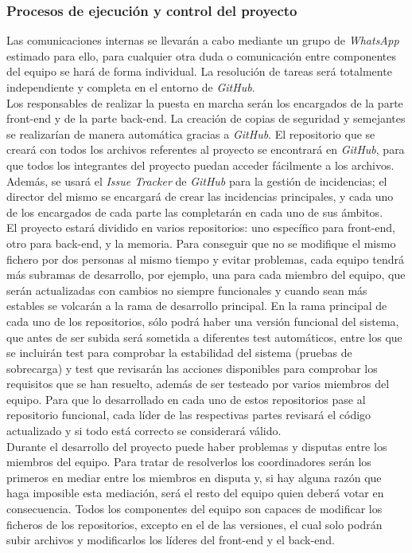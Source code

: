 \documentclass{article}
\begin{document}
\subsubsection{Procesos de ejecución y control del proyecto}
Las comunicaciones internas se llevarán a cabo mediante un grupo de \textit{WhatsApp} estimado para ello, para cualquier otra duda o comunicación entre componentes del equipo se hará de forma individual. La resolución de tareas será totalmente independiente y completa en el entorno de \textit{GitHub}.\\
\hfill \break
Los responsables de realizar la puesta en marcha serán los encargados de la parte front-end y de la parte back-end. La creación de copias de seguridad y semejantes se realizarían de manera automática gracias a \textit{GitHub}. 
\hfill \break
El repositorio que se creará con todos los archivos referentes al proyecto se encontrará en \textit{GitHub}, para que todos los integrantes del proyecto puedan acceder fácilmente a los archivos. Además, se usará el \textit{Issue Tracker} de \textit{GitHub} para la gestión de incidencias; el director del mismo se encargará de crear las incidencias principales, y cada uno de los encargados de cada parte las completarán en cada uno de sus ámbitos.\\
\hfill \break
El proyecto estará dividido en varios repositorios: uno específico para front-end, otro para back-end, y la memoria. Para conseguir que no se modifique el mismo fichero por dos personas al mismo tiempo y evitar problemas, cada equipo tendrá más subramas de desarrollo, por ejemplo, una para cada miembro del equipo, que serán actualizadas con cambios no siempre funcionales y cuando sean más estables se volcarán a la rama de desarrollo principal. 
\hfill \break
En la rama principal de cada uno de los repositorios, sólo podrá haber una versión funcional del sistema, que antes de ser subida será sometida a diferentes test automáticos, entre los que se incluirán test para comprobar la estabilidad del sistema (pruebas de sobrecarga) y test que revisarán las acciones disponibles para comprobar los requisitos que se han resuelto, además de ser testeado por varios miembros del equipo. 
\hfill \break
Para que lo desarrollado en cada uno de estos repositorios pase al repositorio funcional, cada líder de las respectivas partes revisará el código actualizado y si todo está correcto se considerará válido. \\
\hfill \break
Durante el desarrollo del proyecto puede haber problemas y disputas entre los miembros del equipo. Para tratar de resolverlos los coordinadores serán los primeros en mediar entre los miembros en disputa y, si hay alguna razón que haga imposible esta mediación, será el resto del equipo quien deberá votar en consecuencia. 
\hfill \break
Todos los componentes del equipo son capaces de modificar los ficheros de los repositorios, excepto en el de las versiones, el cual solo podrán subir archivos y modificarlos los líderes del front-end y el back-end.
\end{document}
